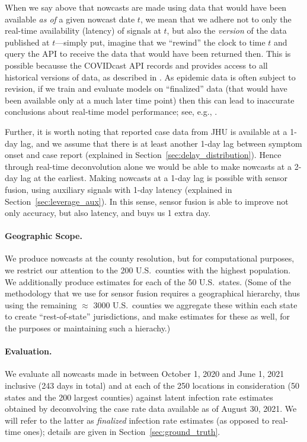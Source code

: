 \documentclass[sts]{imsart}
\theoremstyle{plain}
\theoremstyle{definition}
\theoremstyle{remark}
\begin{document}
When we say above that nowcasts are made using data that would have been
available \emph{as of} a given nowcast date $t$, we mean that we adhere not to
only the real-time availability (latency) of signals at $t$, but also the
\emph{version} of the data published at $t$---simply put, imagine that we
``rewind'' the clock to time $t$ and query the API to receive the data that
would have been returned then. This is possible becausse the COVIDcast API
records and provides access to all historical versions of data, as described in
\citet{Reinhart:2021}. As epidemic data is often subject to revision, if we
train and evaluate models on ``finalized'' data (that would have been available
only at a much later time point) then this can lead to inaccurate conclusions
about real-time model performance; see, e.g., \citet{McDonald:2021}.

Further, it is worth noting that reported case data from JHU is available at a
1-day lag, and we assume that there is at least another 1-day lag between
symptom onset and case report (explained in
Section~\ref{sec:delay_distribution}). Hence through real-time deconvolution
alone we would be able to make nowcasts at a 2-day lag at the earliest. Making
nowcasts at a 1-day lag is possible with sensor fusion, using auxiliary signals 
with 1-day latency (explained in Section~\ref{sec:leverage_aux}). In this sense,
sensor fusion is able to improve not only accuracy, but also latency, and buys
us 1 extra day. 

\smallskip
\paragraph*{Geographic Scope.}

We produce nowcasts at the county resolution, but for computational purposes, we
restrict our attention to the 200 U.S.\ counties with the highest
population. We additionally produce estimates for each of the 50 U.S.\ states. 
(Some of the methodology that we use for sensor fusion requires a geographical
hierarchy, thus using the remaining $\approx$ 3000 U.S.\ counties we aggregate
these within each state to create ``rest-of-state'' jurisdictions, and make
estimates for these as well, for the purposes or maintaining such a hierachy.) 

\smallskip
\paragraph*{Evaluation.}

We evaluate all nowcasts made in between October 1, 2020 and June 1, 2021
inclusive (243 days in total) and at each of the 250 locations in consideration 
(50 states and the 200 largest counties) against latent infection rate estimates 
obtained by deconvolving the case rate data available as of August 30, 2021. 
We will refer to the latter as \emph{finalized} infection rate estimates (as 
opposed to real-time ones); details are given in Section~\ref{sec:ground_truth}. 
\end{document}
